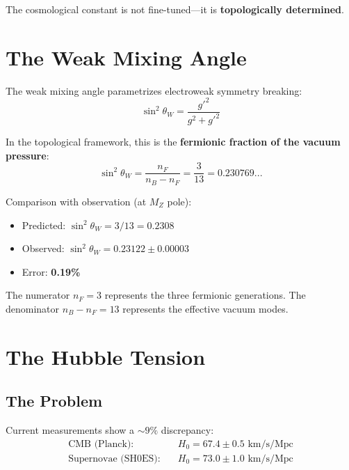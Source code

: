 \documentclass[12pt,a4paper]{article}
\newcommand{\sinW}{\sin^2\theta_W}
\newcommand{\nB}{n_B}
\newcommand{\nF}{n_F}
\begin{document}
The cosmological constant is not fine-tuned---it is \textbf{topologically determined}.

\section{The Weak Mixing Angle}
\label{sec:weinberg}

The weak mixing angle parametrizes electroweak symmetry breaking:
\begin{equation}
\sinW = \frac{g'^2}{g^2 + g'^2}
\end{equation}

In the topological framework, this is the \textbf{fermionic fraction of the vacuum pressure}:
\begin{equation}
\boxed{\sinW = \frac{\nF}{\nB - \nF} = \frac{3}{13} = 0.230769...}
\end{equation}

\begin{keyresult}
Comparison with observation (at $M_Z$ pole):
\begin{itemize}
    \item Predicted: $\sinW = 3/13 = 0.2308$
    \item Observed: $\sinW = 0.23122 \pm 0.00003$
    \item Error: \textbf{0.19\%}
\end{itemize}
\end{keyresult}

The numerator $\nF = 3$ represents the three fermionic generations. The denominator $\nB - \nF = 13$ represents the effective vacuum modes.

\section{The Hubble Tension}
\label{sec:hubble}

\subsection{The Problem}

Current measurements show a $\sim 9\%$ discrepancy:
\begin{align}
\text{CMB (Planck):} \quad &H_0 = 67.4 \pm 0.5 \text{ km/s/Mpc} \\
\text{Supernovae (SH0ES):} \quad &H_0 = 73.0 \pm 1.0 \text{ km/s/Mpc}
\end{align}
\end{document}
